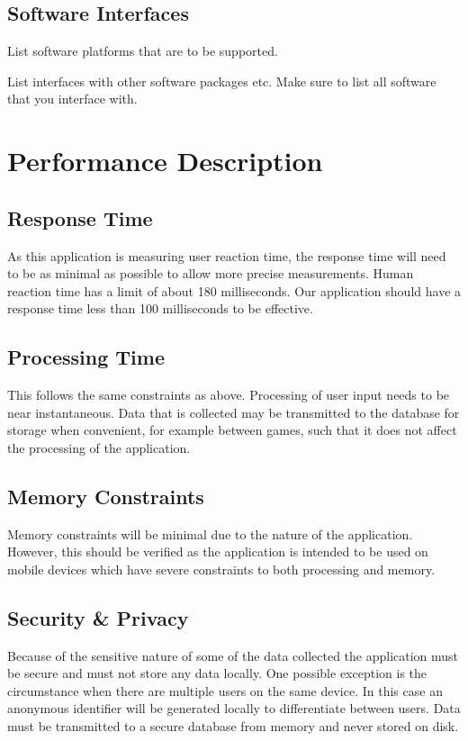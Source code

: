 \documentclass[a4wide]{article}
\begin{document}
\subsection{Software Interfaces}

List software platforms that are to be supported.

List interfaces with other software packages etc.
Make sure to list all software that you interface with.



\section{Performance Description}

\subsection{Response Time}
As this application is measuring user reaction time, the response time will need to be as minimal as possible to allow more precise measurements.  Human reaction time has a limit of about 180 milliseconds.  Our application should have a response time less than 100 milliseconds to be effective.

\subsection{Processing Time}
This follows the same constraints as above.  Processing of user input needs to be near instantaneous.  Data that is collected may be transmitted to the database for storage when convenient, for example between games, such that it does not affect the processing of the application.

\subsection{Memory Constraints}
Memory constraints will be minimal due to the nature of the application.  However, this should be verified as the application is intended to be used on mobile devices which have severe constraints to both processing and memory.

\subsection{Security \& Privacy}
Because of the sensitive nature of some of the data collected the application must be secure and must not store any data locally.  One possible exception is the circumstance when there are multiple users on the same device.  In this case an anonymous identifier will be generated locally to differentiate between users.  Data must be transmitted to a secure database from memory and never stored on disk.
\end{document}

